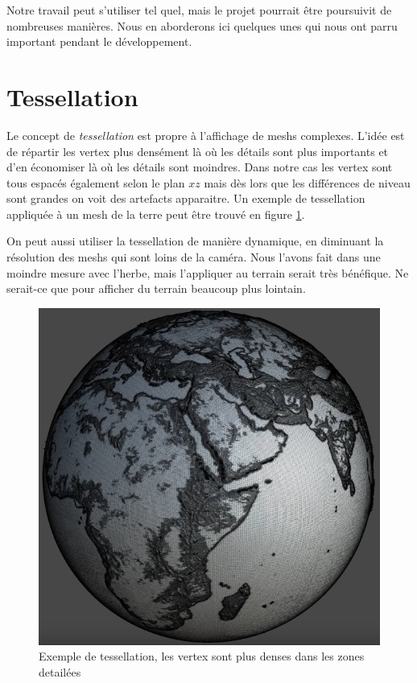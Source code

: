 \documentclass{EPUProjetDi}
\begin{document}
Notre travail peut s'utiliser tel quel, mais le projet pourrait être poursuivit de nombreuses manières. Nous en aborderons ici quelques unes qui nous ont parru important pendant le développement.

\section{Tessellation}

Le concept de \textit{tessellation} est propre à l'affichage de meshs complexes. L'idée est de répartir les vertex plus densément là où les détails sont plus importants et d'en économiser là où les détails sont moindres. Dans notre cas les vertex sont tous espacés également selon le plan $xz$ mais dès lors que les différences de niveau sont grandes on voit des artefacts apparaitre. Un exemple de tessellation appliquée à un mesh de la terre peut être trouvé en figure \ref{fig:tessellation_example}.
\par
On peut aussi utiliser la tessellation de manière dynamique, en diminuant la résolution des meshs qui sont loins de la caméra. Nous l'avons fait dans une moindre mesure avec l'herbe, mais l'appliquer au terrain serait très bénéfique. Ne serait-ce que pour afficher du terrain beaucoup plus lointain.

\begin{figure}[ht]
	\centering
	\includegraphics[scale=.4]{tessellation}
	\caption{Exemple de tessellation, les vertex sont plus denses dans les zones detailées\cite{tessellation}}
	\label{fig:tessellation_example}
\end{figure}
\end{document}
